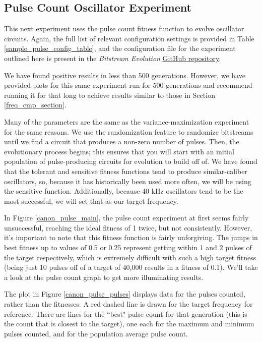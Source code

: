 \documentclass{ieeeaccess}
\newcommand{\highlight}[1]{#1}
\begin{document}
\begin{appendices}
\subsection{Pulse Count Oscillator Experiment}
\label{sec_pulse_count_results}


This next experiment uses the pulse count fitness function to evolve oscillator circuits. Again, the full list of relevant configuration settings is provided in Table \ref{sample_pulse_config_table}, and the configuration file for the experiment outlined here is present in the \textit{Bitstream Evolution} \href{https://github.com/evolvablehardware/BitstreamEvolution/blob/main/data/example_configs/40k_oscillator.ini}{GitHub repository}.

We have found positive results in less than 500 generations. However, we have provided plots for this same experiment run for 500 generations and recommend running it for that long to achieve results similar to those in Section \ref{freq_cmp_section}.

Many of the parameters are the same as the variance-maximization experiment for the same reasons. We use the randomization feature to randomize bitstreams until we find a circuit that produces a non-zero number of pulses. Then, the evolutionary process begins; this ensures that you will start with an initial population of pulse-producing circuits for evolution to build off of. We have found that the tolerant and sensitive fitness functions tend to produce similar-caliber oscillators, so, because it has historically been used more often, we will be using the sensitive function. Additionally, because 40 kHz oscillators tend to be the most successful, we will set that as our target frequency.

In Figure \ref{canon_pulse_main}, the pulse count experiment at first seems fairly unsuccessful, \highlight{reaching the ideal fitness of 1 twice, but not consistently}. However, it's important to note that this fitness function is fairly unforgiving. \highlight{The jumps in best fitness up to values of 0.5 or 0.25 represent getting within 1 and 2 pulses of the target respectively, which is extremely difficult with such a high target fitness (being just 10 pulses off of a target of 40,000 results in a fitness of 0.1).} We'll take a look at the pulse count graph to get more illuminating results.

The plot in Figure \ref{canon_pulse_pulses} displays data for the pulses counted, rather than the fitnesses. A red dashed line is drawn for the target frequency for reference. There are lines for the ``best" pulse count for that generation (this is the count that is closest to the target), one each for the maximum and minimum pulses counted, and for the population average pulse count. 


\end{appendices}
\end{document}
